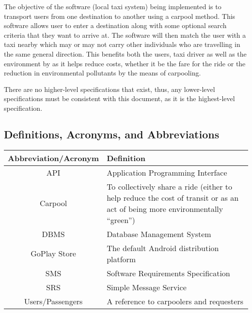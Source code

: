 \documentclass[]{article}
\begin{document}
The objective of the software (local taxi system) being implemented is to transport users from one destination to another using a carpool method. This software allows user to enter a destination along with some optional search criteria that they want to arrive at. The software will then match the user with a taxi nearby which may or may not carry other individuals who are travelling in the same general direction. This benefits both the users, taxi driver as well as the environment by as it helps reduce costs, whether it be the fare for the ride or the reduction in environmental pollutants by the means of carpooling.

There are no higher-level specifications that exist, thus, any lower-level specifications must be consistent with this document, as it is the highest-level specification.

\subsection{Definitions, Acronyms, and Abbreviations}
\label{sub:definitions_acronyms_and_abbreviations}
\begin{center} \begin{tabular} {|c|p{35em}|}
	\hline
	\textbf{Abbreviation/Acronym} & \textbf{Definition} \\
	\hline \hline
	API & Application Programming Interface \\
	\hline
	Carpool & To collectively share a ride (either to help reduce the cost of transit or as an act of being more environmentally “green”) \\
	\hline
	DBMS & Database Management System \\
	\hline
	GoPlay Store & The default Android distribution platform \\
	\hline
	SMS & Software Requirements Specification \\
	\hline
	SRS & Simple Message Service \\
	\hline
	Users/Passengers & A reference to carpoolers and requesters\\
	\hline
\end{tabular} \end{center}
\end{document}
